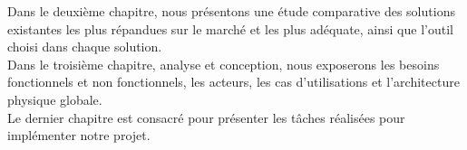 Dans le deuxième chapitre, nous présentons une étude comparative des solutions existantes  les
plus répandues sur le marché et les plus adéquate, ainsi que l’outil choisi dans chaque solution.\\[0.3cm]
Dans le troisième chapitre, analyse et conception,  nous exposerons les besoins
fonctionnels et non fonctionnels, les acteurs, les cas d’utilisations et l’architecture physique globale.\\[0.3cm]
Le dernier chapitre est consacré pour présenter les tâches réalisées pour implémenter notre
projet.
